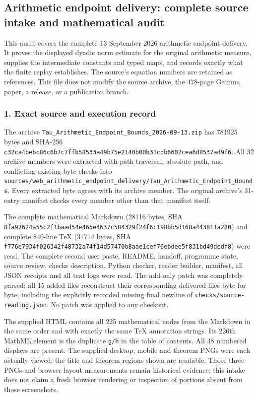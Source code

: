 \subsection{Arithmetic endpoint delivery: complete source intake and mathematical audit}\label{endpoint-arithmetic_intake--arithmetic-endpoint-delivery-complete-source-intake-and-mathematical-audit}

This audit covers the complete 13 September 2026 arithmetic endpoint delivery. It proves the displayed dyadic norm estimate for the original arithmetic measure, supplies the intermediate constants and typed maps, and records exactly what the finite replay establishes. The source's equation numbers are retained as references. This file does not modify the source archive, the 478-page Gamma paper, a release, or a publication branch.

\subsubsection{1. Exact source and execution record}\label{endpoint-arithmetic_intake--exact-source-and-execution-record}

The archive \nolinkurl{Tau_Arithmetic_Endpoint_Bounds_2026-09-13.zip} has 781925 bytes and SHA-256 \nolinkurl{c32ca4bebc86c6b7c7ffb58533a49b75e2140b00b31cdb6602cea6d8537ad9f6}. All 32 archive members were extracted with path traversal, absolute path, and conflicting-existing-byte checks into \nolinkurl{sources/web_arithmetic_endpoint_delivery/Tau_Arithmetic_Endpoint_Bounds}. Every extracted byte agrees with its archive member. The original archive's 31-entry manifest checks every member other than that manifest itself.

The complete mathematical Markdown (28116 bytes, SHA \nolinkurl{8fa97624a55c2f1baad54e465e4637c584329f24f6c198bb5d168a443811a280}) and complete 840-line TeX (31714 bytes, SHA \nolinkurl{f776e7934f026342f48732a74f14d57470b8aae1cef76ebdee5f831bd49dedf8}) were read. The complete second user paste, README, handoff, programme state, source review, checks description, Python checker, reader builder, manifest, all JSON receipts and all text logs were read. The add-only patch was completely parsed; all 15 added files reconstruct their corresponding delivered files byte for byte, including the explicitly recorded missing final newline of \nolinkurl{checks/source-reading.json}. No patch was applied to any checkout.

The supplied HTML contains all 225 mathematical nodes from the Markdown in the same order and with exactly the same TeX annotation strings. Its 226th MathML element is the duplicate \nolinkurl{g/h} in the table of contents. All 48 numbered displays are present. The supplied desktop, mobile and theorem PNGs were each actually viewed; the title and theorem regions shown are readable. Those three PNGs and browser-layout measurements remain historical evidence; this intake does not claim a fresh browser rendering or inspection of portions absent from those screenshots.

